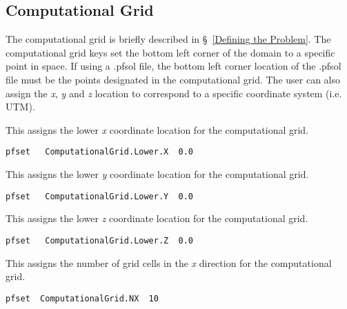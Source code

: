 
\subsection{Computational Grid}
\label{Computational Grid}

The computational grid is briefly described in \S~\ref{Defining the Problem}. The computational grid keys set
the bottom left corner of the domain to a specific point in space. If using 
a .pfsol file, the bottom left corner location of the .pfsol file must be the points
designated in the computational grid. The user can also assign the \emph{x}, \emph{y} 
and \emph{z} location to correspond to a specific coordinate system (i.e. UTM).

{This assigns the lower \emph{x} coordinate location for the computational grid.}
\begin{display}\begin{verbatim} 
pfset   ComputationalGrid.Lower.X  0.0
\end{verbatim}\end{display} 

{This assigns the lower \emph{y} coordinate location for the computational grid.}
\begin{display}\begin{verbatim} 
pfset   ComputationalGrid.Lower.Y  0.0
\end{verbatim}\end{display} 

{This assigns the lower \emph{z} coordinate location for the computational grid.}
\begin{display}\begin{verbatim} 
pfset   ComputationalGrid.Lower.Z  0.0
\end{verbatim}\end{display} 

{This assigns the number of grid cells in the \emph{x} direction for the computational grid.}
\begin{display}\begin{verbatim} 
pfset  ComputationalGrid.NX  10 
\end{verbatim}\end{display} 

